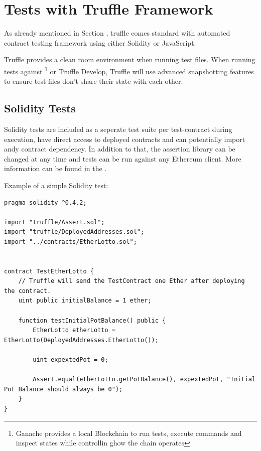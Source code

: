 \newpage
\section{Tests with Truffle Framework}\label{sec:truffleTest}

As already mentioned in Section , truffle comes standard with automated contract testing framework using either Solidity or JavaScript.

Truffle provides a clean room environment when running test files. When running tests against \footnote{Ganache provides a local Blockchain to run tests, execute commands and inspect states while controllin ghow the chain operates} or Truffle Develop, Truffle will use advanced snapshotting features to ensure test files don't share their state with each other.

\subsection{Solidity Tests}\label{sec:solTest}

Solidity tests are included as a seperate test suite per test-contract during execution, have direct access to deployed contracts and can potentially import andy contract dependency. In addition to that, the assertion library can be changed at any time and tests can be run against any Ethereum client. More information can be found in the .

Example of a simple Solidity test:
\begin{lstlisting}[language=Solidity]
pragma solidity ^0.4.2;

import "truffle/Assert.sol";
import "truffle/DeployedAddresses.sol";
import "../contracts/EtherLotto.sol";


contract TestEtherLotto {
    // Truffle will send the TestContract one Ether after deploying the contract.
    uint public initialBalance = 1 ether;

    function testInitialPotBalance() public {
        EtherLotto etherLotto = EtherLotto(DeployedAddresses.EtherLotto());

        uint expextedPot = 0;

        Assert.equal(etherLotto.getPotBalance(), expextedPot, "Initial Pot Balance should always be 0");
    }
}
\end{lstlisting}


